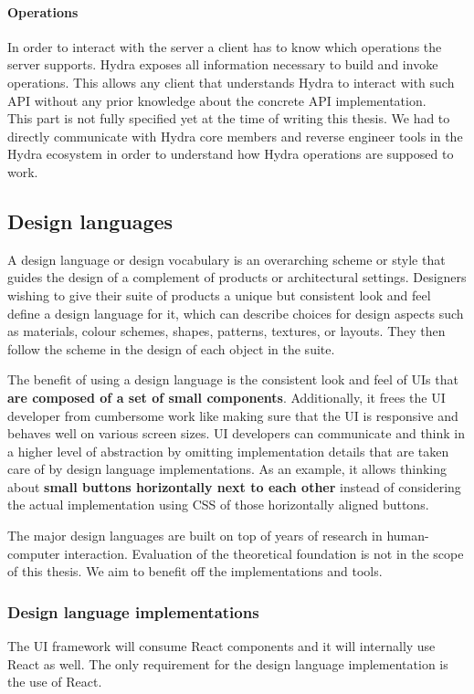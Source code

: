 \paragraph{Operations}
In order to interact with the server a client has to know which operations the server supports. Hydra exposes all information necessary to build and invoke operations. This allows any client that understands Hydra to interact with such API without any prior knowledge about the concrete API implementation. \\
This part is not fully specified yet at the time of writing this thesis. We had to directly communicate with Hydra core members and reverse engineer tools in the Hydra ecosystem in order to understand how Hydra operations are supposed to work.

\subsection{Design languages}
A design language or design vocabulary is an overarching scheme or style that guides the design of a complement of products or architectural settings. Designers wishing to give their suite of products a unique but consistent look and feel define a design language for it, which can describe choices for design aspects such as materials, colour schemes, shapes, patterns, textures, or layouts. They then follow the scheme in the design of each object in the suite. \citep{designlanguage}

The benefit of using a design language is the consistent look and feel of UIs that \textbf{are composed of a set of small components}. Additionally, it frees the UI developer from cumbersome work like making sure that the UI is responsive and behaves well on various screen sizes. UI developers can communicate and think in a higher level of abstraction by omitting implementation details that are taken care of by design language implementations. As an example, it allows thinking about \textbf{small buttons horizontally next to each other} instead of considering the actual implementation using CSS of those horizontally aligned buttons.

The major design languages are built on top of years of research in human-computer interaction. Evaluation of the theoretical foundation is not in the scope of this thesis. We aim to benefit off the implementations and tools.

\subsubsection{Design language implementations}
The UI framework will consume React components and it will internally use React as well. The only requirement for the design language implementation is the use of React.

